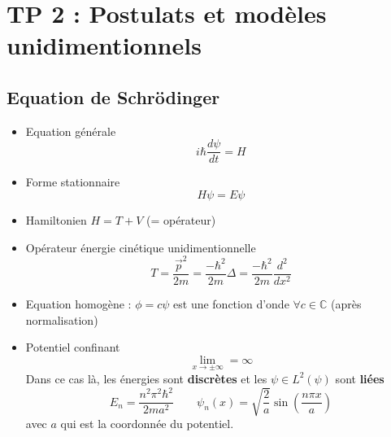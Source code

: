 
\section*{TP 2 : Postulats et modèles unidimentionnels}
\subsection*{Equation de Schrödinger}
\begin{itemize}
	\item Equation générale
	      \begin{equation}
	      	i\hbar \frac{d \psi}{dt} = H
	      \end{equation}
	      	
	\item Forme stationnaire
	      \begin{equation}
	      	H\psi = E\psi
	      \end{equation}
	      
	\item Hamiltonien $H = T + V$ (= opérateur) 
	      
	\item Opérateur énergie cinétique unidimentionnelle
	      \begin{equation}
	      	T = \frac{\vec{p}^2}{2m} = \frac{- \hbar ^2}{2m}\Delta = \frac{- \hbar ^2}{2m}\frac{d^2}{dx^2}
	      \end{equation}
	      
	\item Equation homogène : $\phi = c\psi$ est une fonction d'onde $\forall c \in \mathbb{C}$ (après normalisation)
	      
	\item Potentiel confinant 
	      \begin{equation}
	      	\lim _{x \rightarrow \pm \infty} = \infty
	      \end{equation}
	      Dans ce cas là, les énergies sont \textbf{discrètes} et les $\psi \in L^2(\psi )$ sont \textbf{liées}
	      \begin{equation}
	      	E_n = \frac{n^2\pi ^2 \hbar ^2}{2ma^2} \qquad \psi _n (x) = \sqrt{\frac{2}{a}} \sin (\frac{n\pi x}{a} )
	      \end{equation}
	      avec $a$ qui est la coordonnée du potentiel.
\end{itemize}

